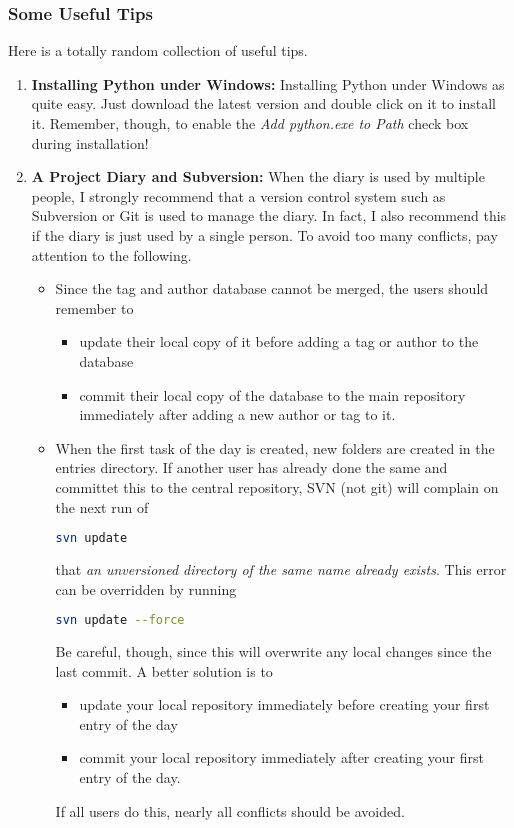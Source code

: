 \subsubsection*{Some Useful Tips}
Here is a totally random collection of useful tips.
\begin{enumerate}
    \item \textbf{Installing  Python under Windows:}\newline
    Installing Python under Windows as quite easy. Just download the latest version and double click on it to install it. Remember, though, to enable the \textit{Add python.exe to Path} check box during installation!
    \item \textbf{A Project Diary and Subversion:}\newline
    When the diary is used by multiple people, I strongly recommend that a version control system such as Subversion or Git is used to manage the diary. In fact, I also recommend this if the diary is just used by a single person. To avoid too many conflicts, pay attention to the following.
    \begin{itemize}
        \item Since the tag and author database cannot be merged, the users should remember to
        \begin{itemize}
            \item update their local copy of it before adding a tag or author to the database
            \item commit their local copy of the database to the main repository immediately after adding a new author or tag to it.
        \end{itemize}
        \item When the first task of the day is created, new folders are created in the entries directory. If another user has already done the same and committet this to the central repository, SVN (not git) will complain on the next run of
\begin{lstlisting}[language=bash]
svn update
\end{lstlisting}     
        that \textit{an unversioned directory of the same name already exists}. This error can be overridden by running 
\begin{lstlisting}[language=bash]
svn update --force
\end{lstlisting}
    Be careful, though, since this will overwrite any local changes since the last commit. A better solution is to
        \begin{itemize}
            \item update your local repository immediately before creating your first entry of the day
            \item commit your local repository immediately after creating your first entry of the day.
        \end{itemize}
        If all users do this, nearly all conflicts should be avoided.
    \end{itemize}
\end{enumerate}

